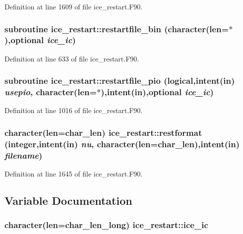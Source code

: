 Definition at line 1609 of file ice\_\-restart.F90.\hypertarget{namespaceice__restart_ad32165edb70403f5261f5d7e4f91e0ec}{
\subsubsection[{restartfile\_\-bin}]{\setlength{\rightskip}{0pt plus 5cm}subroutine ice\_\-restart::restartfile\_\-bin (character(len=$\ast$),optional {\em ice\_\-ic})}}
\label{namespaceice__restart_ad32165edb70403f5261f5d7e4f91e0ec}


Definition at line 633 of file ice\_\-restart.F90.\hypertarget{namespaceice__restart_ab42c7fd99429cb9ca5ec096c45840c08}{
\subsubsection[{restartfile\_\-pio}]{\setlength{\rightskip}{0pt plus 5cm}subroutine ice\_\-restart::restartfile\_\-pio (logical,intent(in) {\em usepio}, \/  character(len=$\ast$),intent(in),optional {\em ice\_\-ic})}}
\label{namespaceice__restart_ab42c7fd99429cb9ca5ec096c45840c08}


Definition at line 1016 of file ice\_\-restart.F90.\hypertarget{namespaceice__restart_aba88448e14afbb601cdae9f2c86b6943}{
\subsubsection[{restformat}]{\setlength{\rightskip}{0pt plus 5cm}character(len=char\_\-len) ice\_\-restart::restformat (integer,intent(in) {\em nu}, \/  character(len=char\_\-len),intent(in) {\em filename})}}
\label{namespaceice__restart_aba88448e14afbb601cdae9f2c86b6943}


Definition at line 1645 of file ice\_\-restart.F90.

\subsection{Variable Documentation}
\hypertarget{namespaceice__restart_a7b5bbbfe819de3da4a61882a1c69631d}{
\subsubsection[{ice\_\-ic}]{\setlength{\rightskip}{0pt plus 5cm}character(len=char\_\-len\_\-long) {\bf ice\_\-restart::ice\_\-ic}}}
\label{namespaceice__restart_a7b5bbbfe819de3da4a61882a1c69631d}


